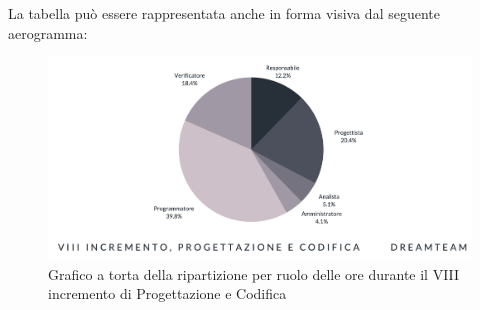 La tabella può essere rappresentata anche in forma visiva dal seguente aerogramma:
\begin{figure}[H]
\centering
\includegraphics[scale=0.55]{Sezioni/SezioniPreventivo/grafici/Preventivo_torta_progettazione_VIII.png}
\caption{Grafico a torta della ripartizione per ruolo delle ore durante il VIII incremento di Progettazione e Codifica}
\end{figure}

\pagebreak



